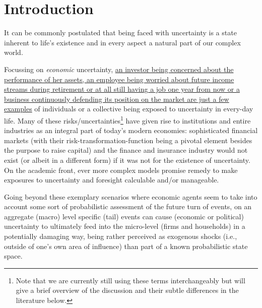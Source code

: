 \documentclass[a4paper,11pt,listof=nochaptergap,oneside,pointednumbers,bibtotoc,bigheadings,liststotoc,hidelinks]{scrbook}
\theoremstyle{mysatz}
\theoremstyle{mydefinition}
\theoremstyle{mytheorem}
\theoremstyle{mybemerkung}
\begin{document}
\chapter{Introduction}
\label{introduction}
It can be commonly postulated that being faced with uncertainty is a state inherent to life's existence and in every aspect a natural part of our complex world.

Focussing on \textit{economic} uncertainty, \href{http://citeseerx.ist.psu.edu/viewdoc/download?doi=10.1.1.334.4248&rep=rep1&type=pdf}{an investor being concerned about the performance of her assets, an employee being worried about future income streams during retirement or at all still having a job one year from now or a business continuously defending its position on the market are just a few examples} of individuals or a collective being exposed to uncertainty in every-day life. Many of these risks/uncertainties\footnote{Note that we are currently still using these terms interchangeably but will give a brief overview of the discussion and their subtle differences in the literature below.} have given rise to institutions and entire industries as an integral part of today's modern economies: sophisticated financial markets (with their risk-transformation-function being a pivotal element besides the purpose to raise capital) and the finance and insurance industry would not exist (or albeit in a different form) if it was not for the existence of uncertainty. On the academic front, ever more complex models promise remedy to make exposures to uncertainty and foresight calculable and/or manageable.

Going beyond these exemplary scenarios where economic agents seem to take into account some sort of probabilistic assessment of the future turn of events, on an aggregate (macro) level specific (tail) events can cause (economic or political) uncertainty to ultimately feed into the micro-level (firms and households) in a potentially damaging way, being rather perceived as exogenous shocks (i.e., outside of one's own area of influence) than part of a known probabilistic state space.
\end{document}
